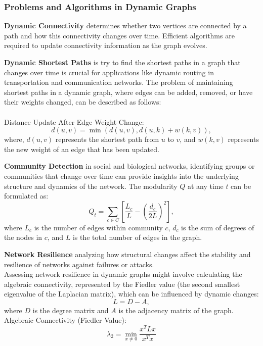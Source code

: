 \documentclass[12pt]{article}
\begin{document}
    \subsubsection{Problems and Algorithms in Dynamic Graphs}
    \textbf{Dynamic Connectivity} determines whether two vertices are connected by a path and how this
    connectivity changes over time. Efficient algorithms are required to update
    connectivity information as the graph evolves.
    
    \textbf{Dynamic Shortest Paths} is try to find the shortest paths in a graph that changes over time is crucial
    for applications like dynamic routing in transportation and communication
    networks. The problem of maintaining shortest paths in a dynamic graph, where edges
    can be added, removed, or have their weights changed, can be described as follows:\\
    \\
    Distance Update After Edge Weight Change:
    \begin{equation}
        d(u, v) = \min(d(u, v), d(u, k) + w(k, v)),
    \end{equation}
    where, \( d(u, v) \) represents the shortest path from \( u \) to \( v \),
    and \( w(k, v) \) represents the new weight of an edge that has been updated.
    
    \textbf{Community Detection} in social and biological networks, identifying groups or communities that
    change over time can provide insights into the underlying structure and
    dynamics of the network. The modularity \( Q \) at any time \( t \) can be
    formulated as:
    \begin{equation}
        Q_t = \sum_{c \in C} \left[ \frac{L_c}{L} - \left( \frac{d_c}{2L} \right)^2 \right],
    \end{equation}
    where \( L_c \) is the number of edges within community \( c \), \( d_c \) is the
    sum of degrees of the nodes in \( c \), and \( L \) is the total number of edges
    in the graph.
    
    \textbf{Network Resilience}
    analyzing how structural changes affect the stability and resilience of
    networks against failures or attacks.\\
    Assessing network resilience in dynamic graphs might involve calculating the
    algebraic connectivity, represented by the Fiedler value (the second smallest
    eigenvalue of the Laplacian matrix), which can be influenced by dynamic changes:
    \begin{equation}
        L = D - A,
    \end{equation}
    where \( D \) is the degree matrix and \( A \) is the adjacency matrix of the
    graph.\\
    Algebraic Connectivity (Fiedler Value):
    \begin{equation}
        \lambda_2 = \min_{x \neq 0} \frac{x^T L x}{x^T x}
    \end{equation}

\newpage

\printbibliography
\end{document}

